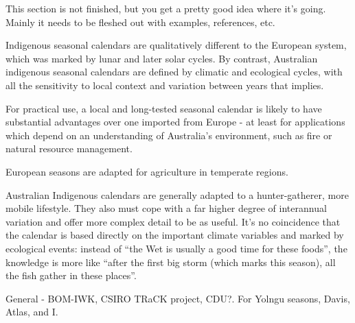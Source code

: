 This section is not finished, but you get a pretty good idea where it's
going.  Mainly it needs to be fleshed out with examples, references, etc.

Indigenous seasonal calendars are qualitatively different to the European
system, which was marked by lunar and later solar cycles.  By contrast,
Australian indigenous seasonal calendars are defined by climatic and ecological
cycles, with all the sensitivity to local context and variation between years
that implies.

For practical use, a local and long-tested seasonal calendar is likely to have
substantial advantages over one imported from Europe - at least for
applications which depend on an understanding of Australia's environment, such
as fire or natural resource management.

European seasons are adapted for agriculture in temperate regions.

Australian Indigenous calendars are generally adapted to a hunter-gatherer,
more mobile lifestyle.  They also must cope with a far higher degree of
interannual variation and offer more complex detail to be as useful.  It's no
coincidence that the calendar is based directly on the important climate
variables and marked by ecological events:  instead of ``the Wet is usually a
good time for these foods'', the knowledge is more like ``after the first big
storm (which marks this season), all the fish gather in these places''.




General - BOM-IWK, CSIRO TRaCK project, CDU?.  For Yolngu seasons, Davis, Atlas, and I.



